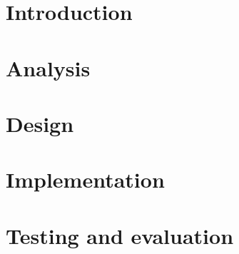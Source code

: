 \documentclass[11pt]{report}
\title{}
\subtitle{}
\begin{document}
    

    \maketitle

    \tableofcontents



    \chapter{Introduction}\label{ch:introduction}

    

    \chapter{Analysis}\label{ch:analysis}

    
    
    

    \chapter{Design}\label{ch:design}

    
    
    

    \chapter{Implementation}\label{ch:implementation}

    
    
    
    
    

    \chapter{Testing and evaluation}\label{ch:testing-and-evaluation}
\end{document}
